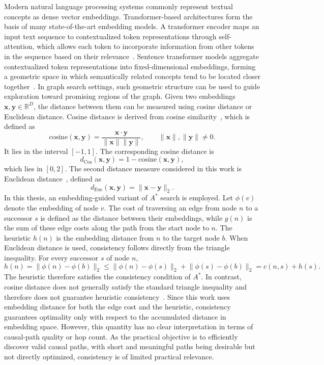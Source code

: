 Modern natural language processing systems commonly represent textual concepts as dense vector embeddings. Transformer-based architectures form the basis of many state-of-the-art embedding models. A transformer encoder maps an input text sequence to contextualized token representations through self-attention, which allows each token to incorporate information from other tokens in the sequence based on their relevance~\cite{vaswani:2017}. Sentence transformer models aggregate contextualized token representations into fixed-dimensional embeddings, forming a geometric space in which semantically related concepts tend to be located closer together~\cite{reimers:2019}. In graph search settings, such geometric structure can be used to guide exploration toward promising regions of the graph. Given two embeddings $\mathbf{x}, \mathbf{y} \in \mathbb{R}^{D}$, the distance between them can be measured using cosine distance or Euclidean distance. Cosine distance is derived from cosine similarity~\cite{manning:2008}, which is defined as \[ \text{cosine}(\mathbf{x}, \mathbf{y}) = \frac{\mathbf{x} \cdot \mathbf{y}}{\|\mathbf{x}\|\|\mathbf{y}\|}, \qquad \|\mathbf{x}\|,\|\mathbf{y}\| \neq 0. \] It lies in the interval $[-1,1]$. The corresponding cosine distance is \[ d_{\text{Cos}}(\mathbf{x}, \mathbf{y}) = 1 - \text{cosine}(\mathbf{x}, \mathbf{y}), \]
which lies in $[0,2]$. The second distance measure considered in this work is Euclidean distance~\cite{manning:2008}, defined as
\[
d_{\text{Euc}}(\mathbf{x}, \mathbf{y}) =
\|\mathbf{x} - \mathbf{y}\|_2.
\]
In this thesis, an embedding-guided variant of $A^*$ search is employed. Let $\phi(v)$ denote the embedding of node $v$. The cost of traversing an edge from node $n$ to a successor $s$ is defined as the distance between their embeddings, while $g(n)$ is the sum of these edge costs along the path from the start node to $n$. The heuristic $h(n)$ is the embedding distance from $n$ to the target node $b$. When Euclidean distance is used, consistency follows directly from the triangle inequality. For every successor $s$ of node $n$,
\[
h(n)
=
\lVert \phi(n)-\phi(b)\rVert_2
\leq
\lVert \phi(n)-\phi(s)\rVert_2
+
\lVert \phi(s)-\phi(b)\rVert_2
=
c(n,s)+h(s).
\]
The heuristic therefore satisfies the consistency condition of $A^*$. In contrast, cosine distance does not generally satisfy the standard triangle inequality and therefore does not guarantee heuristic consistency~\cite{schubert:2021}. Since this work uses embedding distance for both the edge cost and the heuristic, consistency guarantees optimality only with respect to the accumulated distance in embedding space. However, this quantity has no clear interpretation in terms of causal-path quality or hop count. As the practical objective is to efficiently discover valid causal paths, with short and meaningful paths being desirable but not directly optimized, consistency is of limited practical relevance.

